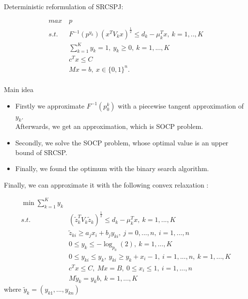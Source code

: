 \documentclass{beamer}
\begin{document}
\begin{frame}

Deterministic reformulation of SRCSPJ:

\begin{align*}
	max\ & p\\
	s.t.\ & F^{-1}(p^{y_k})(x^TV_kx)^{\frac{1}{2}} \leq d_k - \mu_k^Tx,\ k=1,..,K \\
	& \sum_{k=1}^K{y_k} = 1,\ y_k \geq 0,\ k=1, ..., K \\
	& c^T x \leq C \\
	& Mx = b,\ x \in \{0, 1\}^n.\\
\end{align*}
\end{frame}

\begin{frame}
	\begin{block}{Main idea}
		\begin{itemize}
			\pause
			\item Firstly we approximate $F^{-1}(p_0^{k})$ with a piecewise tangent approximation of $y_k$. \\
			Afterwards, we get an approximation, which is SOCP problem.
			\pause
			\item Secondly, we solve the SOCP problem, whose optimal value is an upper bound
			of SRCSP.
			\pause
			\item Finally, we found the optimum with the binary search algorithm.
		\end{itemize}
	\end{block}
\end{frame}

\begin{frame}
	Finally, we can approximate it with the following convex relaxation :

\begin{align*}
\min{\sum_{k=1}^K{y_k}}\\
 s.t.\ & (\tilde{z}_k^TV_k\tilde{z}_k)^\frac{1}{2} \leq d_k - \mu_k^Tx,\ k=1, ..., K \\
	& \tilde{z}_{ki} \geq a_jx_i +b_jy_{ki},\ j = 0, ..., n,\ i = 1, ..., n \\
	& 0 \leq y_k \leq - \log_{p_0}{(2)},\ k = 1, ..., K \\
	& 0 \leq y_{ki} \leq y_k,\ y_{ki} \geq y_k + x_i - 1,\ i =  1, ..., n,\ k = 1, ..., K \\
	& c^Tx \leq C,\ Mx = B,\ 0 \leq x_i \leq 1,\ i=1, ..., n  \\
	& M\tilde{y}_k = y_kb,\ k = 1, ..., K
\end{align*}
where $\tilde{y}_k = (y_{k1} , . . . , y_{kn})$
\end{frame}
\end{document}
